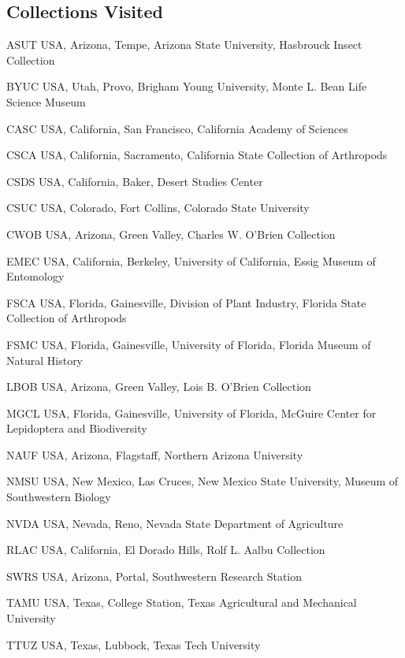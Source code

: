 \documentclass[12pt,a4paper]{article}
\begin{document}
	\subsection*{Collections Visited}
		\begin{collections}
			\item [ASUT] USA, Arizona, Tempe, Arizona State University, Hasbrouck Insect Collection
			\item [BYUC] USA, Utah, Provo, Brigham Young University, Monte L. Bean Life Science Museum
			\item [CASC] USA, California, San Francisco, California Academy of Sciences
			\item [CSCA] USA, California, Sacramento, California State Collection of Arthropods
			\item [CSDS] USA, California, Baker, Desert Studies Center
			\item [CSUC] USA, Colorado, Fort Collins, Colorado State University
			\item [CWOB] USA, Arizona, Green Valley, Charles W. O'Brien Collection
			\item [EMEC] USA, California, Berkeley, University of California, Essig Museum of Entomology
			\item [FSCA] USA, Florida, Gainesville, Division of Plant Industry, Florida State Collection of Arthropods
			\item [FSMC] USA, Florida, Gainesville, University of Florida, Florida Museum of Natural History
			\item [LBOB] USA, Arizona, Green Valley, Lois B. O'Brien Collection
			\item [MGCL] USA, Florida, Gainesville, University of Florida, McGuire Center for Lepidoptera and Biodiversity
			\item [NAUF] USA, Arizona, Flagstaff, Northern Arizona University
			\item [NMSU] USA, New Mexico, Las Cruces, New Mexico State University, Museum of Southwestern Biology
			\item [NVDA] USA, Nevada, Reno, Nevada State Department of Agriculture
			\item [RLAC] USA, California, El Dorado Hills, Rolf L. Aalbu Collection
			\item [SWRS] USA, Arizona, Portal, Southwestern Research Station
			\item [TAMU] USA, Texas, College Station, Texas Agricultural and Mechanical University
			\item [TTUZ] USA, Texas, Lubbock, Texas Tech University

\end{collections}
\end{document}
